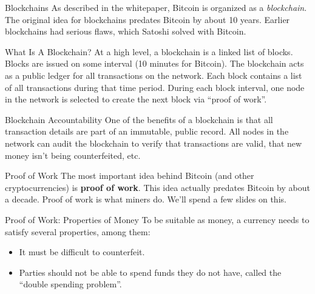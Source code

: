 \documentclass[14pt]{beamer}
\begin{document}
\begin{frame}{Blockchains}
  As described in the whitepaper, Bitcoin is organized as a \emph{blockchain}.
  \newline
  \newline
  The original idea for blockchains predates Bitcoin by about 10 years. Earlier
  blockchains had serious flaws, which Satoshi solved with Bitcoin.
\end{frame}

\begin{frame}{What Is A Blockchain?}
  At a high level, a blockchain is a linked list of blocks. Blocks are issued on
  some interval (10 minutes for Bitcoin). The blockchain acts as a public ledger
  for all transactions on the network.
  \newline
  \newline
  Each block contains a list of all transactions during that time period. During
  each block interval, one node in the network is selected to create the next
  block via ``proof of work''.
\end{frame}

\begin{frame}{Blockchain Accountability}
  One of the benefits of a blockchain is that all transaction details are part
  of an immutable, public record.
  \newline
  \newline
  All nodes in the network can audit the blockchain to verify that transactions
  are valid, that new money isn't being counterfeited, etc.
\end{frame}

\begin{frame}{Proof of Work}
  The most important idea behind Bitcoin (and other cryptocurrencies) is
  \textbf{proof of work}. This idea actually predates Bitcoin by about a decade.
  \newline
  \newline
  Proof of work is what miners do. We'll spend a few slides on this.
\end{frame}

\begin{frame}{Proof of Work: Properties of Money}
  To be suitable as money, a currency needs to satisfy several properties, among them:
  \newline
  \begin{itemize}
  \item It must be difficult to counterfeit.
  \item Parties should not be able to spend funds they do not have, called the
    ``double spending problem''.
  \end{itemize}
\end{frame}
\end{document}
